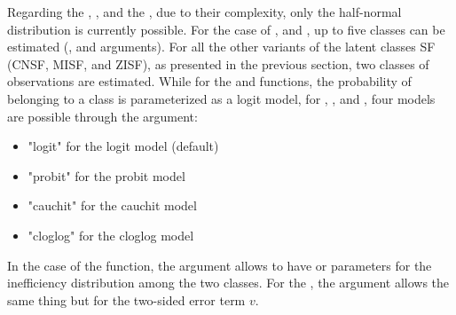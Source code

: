 \documentclass[nojss]{jss}
\begin{document}
Regarding the , , and the 
, due to their complexity, only the half-normal 
distribution is currently possible. For the case of , and 
, up to five classes can be estimated (, 
and  arguments). For all the other variants of the latent
classes SF (CNSF, MISF, and ZISF), as presented in the previous section, two 
classes of observations are estimated. While for the  and 
 functions, the probability of belonging to a class is 
parameterized as a logit model, for , , and
, four models are possible through the  argument:
%
\begin{itemize} \itemsep 10pt
\item "logit" for the logit model (default)
\item "probit" for the probit model
\item "cauchit" for the cauchit model
\item "cloglog" for the cloglog model
\end{itemize}
%
In the case of the  function, the  argument
allows to have  or  parameters for the 
inefficiency distribution among the two classes. For the , 
the argument  allows the same thing but for the two-sided error
term $v$.


\end{document}
